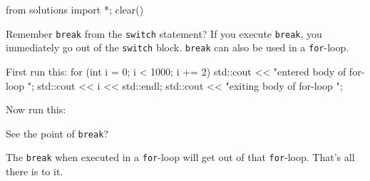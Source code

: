 \begin{python0}
from solutions import *; clear()
\end{python0}

Remember \texttt{break} from the \texttt{switch} statement? If you execute
\texttt{break}, you immediately go out of the \texttt{switch} block.
\texttt{break} can also be used in a \texttt{for}-loop.
\begin{console}
First run this:
for (int i = 0; i < 1000; i += 2)
{
std::cout << "entered body of for-loop \n";
std::cout << i << std::endl;
std::cout << "exiting body of for-loop \n";
} 
\end{console}
Now run this:
See the point of \texttt{break}?

The \texttt{break} when executed in a \texttt{for}-loop will get out of that \texttt{for}-loop. That's all there is to it.

